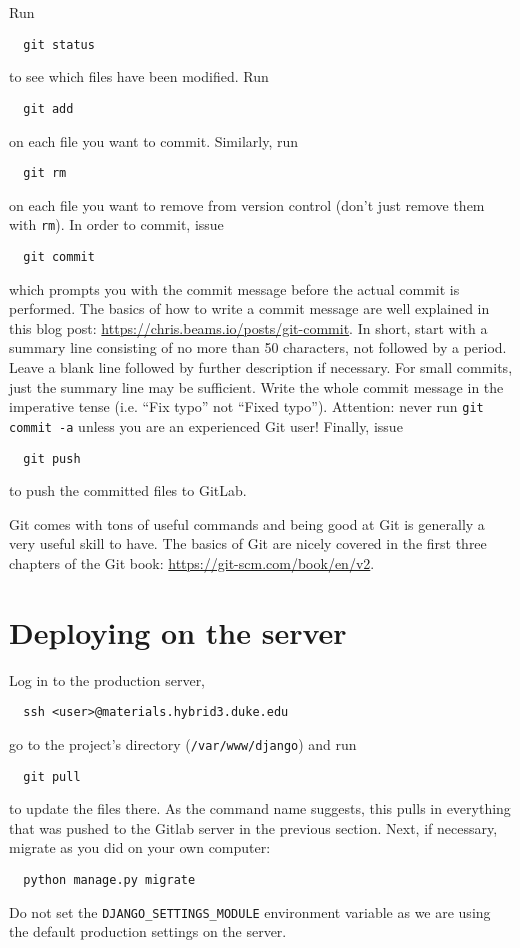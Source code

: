 \documentclass{article}
\begin{document}
Run
\begin{lstlisting}
  git status
\end{lstlisting}
to see which files have been modified. Run
\begin{lstlisting}
  git add
\end{lstlisting}
on each file you want to commit. Similarly, run
\begin{lstlisting}
  git rm
\end{lstlisting}
on each file you want to remove from version control (don't just remove them with \texttt{rm}).
In order to commit, issue
\begin{lstlisting}
  git commit
\end{lstlisting}
which prompts you with the commit message before the actual commit is performed. The basics of how to write a commit message are well explained in this blog post: \url{https://chris.beams.io/posts/git-commit}. In short, start with a summary line consisting of no more than 50 characters, not followed by a period. Leave a blank line followed by further description if necessary. For small commits, just the summary line may be sufficient. Write the whole commit message in the imperative tense (i.e. ``Fix typo'' not ``Fixed typo''). Attention: never run \verb+git commit -a+ unless you are an experienced Git user! Finally, issue
\begin{lstlisting}
  git push
\end{lstlisting}
to push the committed files to GitLab.

Git comes with tons of useful commands and being good at Git is generally a very useful skill to have. The basics of Git are nicely covered in the first three chapters of the Git book: \url{https://git-scm.com/book/en/v2}.

\section{Deploying on the server}

Log in to the production server,
\begin{lstlisting}
  ssh <user>@materials.hybrid3.duke.edu
\end{lstlisting}
go to the project's directory (\verb+/var/www/django+) and run
\begin{lstlisting}
  git pull
\end{lstlisting}
to update the files there. As the command name suggests, this pulls in everything that was pushed to the Gitlab server in the previous section. Next,  if necessary, migrate as you did on your own computer:
\begin{lstlisting}
  python manage.py migrate
\end{lstlisting}
Do not set the \verb+DJANGO_SETTINGS_MODULE+ environment variable as we are using the default production settings on the server.
\end{document}
